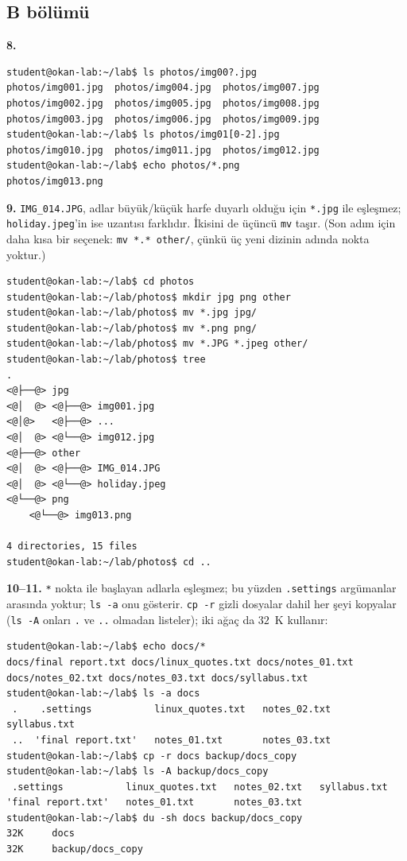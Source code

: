 \documentclass[11pt,a4paper]{article}
\newcommand{\cmd}[1]{\texttt{#1}}
\begin{document}
\subsection*{B bölümü}

\textbf{8.}
\begin{lstlisting}[style=term,basicstyle=\ttfamily\scriptsize\color{light}]
student@okan-lab:~/lab$ ls photos/img00?.jpg
photos/img001.jpg  photos/img004.jpg  photos/img007.jpg
photos/img002.jpg  photos/img005.jpg  photos/img008.jpg
photos/img003.jpg  photos/img006.jpg  photos/img009.jpg
student@okan-lab:~/lab$ ls photos/img01[0-2].jpg
photos/img010.jpg  photos/img011.jpg  photos/img012.jpg
student@okan-lab:~/lab$ echo photos/*.png
photos/img013.png
\end{lstlisting}

\textbf{9.} \texttt{IMG\_014.JPG}, adlar büyük/küçük harfe duyarlı olduğu için \texttt{*.jpg} ile eşleşmez; \texttt{holiday.jpeg}'in ise uzantısı farklıdır. İkisini de üçüncü \cmd{mv} taşır. (Son adım için daha kısa bir seçenek: \cmd{mv *.* other/}, çünkü üç yeni dizinin adında nokta yoktur.)
\begin{lstlisting}[style=term,basicstyle=\ttfamily\scriptsize\color{light}]
student@okan-lab:~/lab$ cd photos
student@okan-lab:~/lab/photos$ mkdir jpg png other
student@okan-lab:~/lab/photos$ mv *.jpg jpg/
student@okan-lab:~/lab/photos$ mv *.png png/
student@okan-lab:~/lab/photos$ mv *.JPG *.jpeg other/
student@okan-lab:~/lab/photos$ tree
.
<@├──@> jpg
<@│  @> <@├──@> img001.jpg
<@│@>   <@├──@> ...
<@│  @> <@└──@> img012.jpg
<@├──@> other
<@│  @> <@├──@> IMG_014.JPG
<@│  @> <@└──@> holiday.jpeg
<@└──@> png
    <@└──@> img013.png

4 directories, 15 files
student@okan-lab:~/lab/photos$ cd ..
\end{lstlisting}

\textbf{10--11.} \texttt{*} nokta ile başlayan adlarla eşleşmez; bu yüzden \texttt{.settings} argümanlar arasında yoktur; \cmd{ls -a} onu gösterir. \cmd{cp -r} gizli dosyalar dahil her şeyi kopyalar (\cmd{ls -A} onları \texttt{.} ve \texttt{..} olmadan listeler); iki ağaç da $32$~K kullanır:
\begin{lstlisting}[style=term,basicstyle=\ttfamily\scriptsize\color{light}]
student@okan-lab:~/lab$ echo docs/*
docs/final report.txt docs/linux_quotes.txt docs/notes_01.txt docs/notes_02.txt docs/notes_03.txt docs/syllabus.txt
student@okan-lab:~/lab$ ls -a docs
 .    .settings           linux_quotes.txt   notes_02.txt   syllabus.txt
 ..  'final report.txt'   notes_01.txt       notes_03.txt
student@okan-lab:~/lab$ cp -r docs backup/docs_copy
student@okan-lab:~/lab$ ls -A backup/docs_copy
 .settings           linux_quotes.txt   notes_02.txt   syllabus.txt
'final report.txt'   notes_01.txt       notes_03.txt
student@okan-lab:~/lab$ du -sh docs backup/docs_copy
32K     docs
32K     backup/docs_copy
\end{lstlisting}
\end{document}
